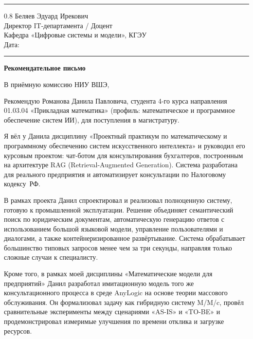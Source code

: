 \documentclass[a4paper,12pt]{article}
\begin{document}
\vspace{4pt}
\noindent\rule{\textwidth}{0.8pt}

\begin{flushright}
  \begin{spacing}{0.8}
    Беляев Эдуард Ирекович\\
    Директор IT-департамента / Доцент\\
    Кафедра «Цифровые системы и модели», КГЭУ\\[6pt]
    Дата: \rule{4cm}{0.4pt}
  \end{spacing}
\end{flushright}

\begin{center}
  {\Large\bfseries Рекомендательное письмо}
\end{center}

В приёмную комиссию НИУ ВШЭ,

Рекомендую Романова Данила Павловича, студента 4-го курса направления 01.03.04 «Прикладная математика» (профиль: ма\-те\-ма\-ти\-че\-ское и про\-грамм\-ное обес\-пе\-че\-ние систем ИИ), для по\-сту\-пле\-ния в ма\-ги\-стра\-ту\-ру.

Я вёл у Данила дисциплину «Проектный практикум по математическому и программному обеспечению систем искусственного интеллекта» и руководил его курсовым проектом: чат-ботом для консультирования бухгалтеров, построенным на архитектуре RAG (Retrieval-Augmented Generation). Система разработана для реального предприятия и автоматизирует консультации по Налоговому кодексу~РФ.

В рамках проекта Данил спроектировал и реализовал полноценную систему, готовую к промышленной эксплуатации. Решение объединяет семантический поиск по юридическим документам, автоматическую генерацию ответов с использованием большой языковой модели, управление пользователями и диалогами, а также контейнеризированное развёртывание. Система обрабатывает большинство типовых запросов менее чем за три секунды, направляя только сложные случаи к специалисту.

Кроме того, в рамках моей дисциплины «Математические модели для предприятий» Данил разработал имитационную модель того же консультационного процесса в среде AnyLogic на основе теории массового обслуживания. Он формализовал задачу как гибридную систему M/M/c, провёл сравнительные эксперименты между сценариями «AS-IS» и «TO-BE» и продемонстрировал измеримые улучшения по времени отклика и загрузке ресурсов.
\end{document}
